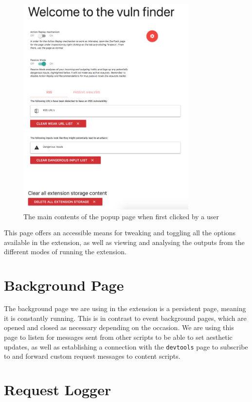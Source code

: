 \begin{figure}[h!]
	\centering
	\includegraphics[width=0.8\textwidth]{images/popup_full.png}
	\caption{The main contents of the popup page when first clicked by a user}
	\label{fig:popup_full}
\end{figure}

This page offers an accessible means for tweaking and toggling all the options available in the extension, as well as viewing and analysing the outputs from the different modes of running the extension.  


\section{Background Page}

The background page we are using in the extension is a persistent page, meaning it is constantly running. This is in contrast to event background pages, which are opened and closed as necessary depending on the occasion. We are using this page to listen for messages sent from other scripts to be able to set aesthetic updates, as well as establishing a connection with the \texttt{devtools} page to subscribe to and forward custom request messages to content scripts.

\section{Request Logger}


